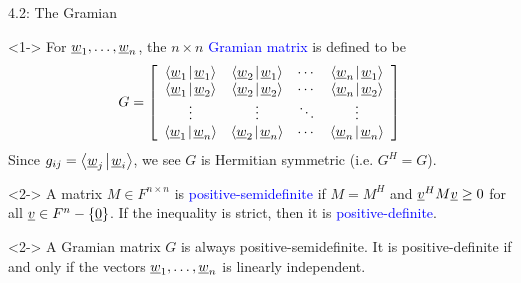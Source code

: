 \documentclass[10pt,english,aspectratio=169]{beamer}
\begin{document}
\begin{frame}{4.2: The Gramian}

\vspace{-1.5mm}

\begin{definition}<1->
For $\underline{w}_1,\ldots,\underline{w}_n$, the $n \times n$ \textcolor{blue}{Gramian matrix} is defined to be \vspace{-2mm}
\begin{equation*}
G = \left[ \begin{array}{cccc}
\inner{ \vecnot{w}_1 }{ \vecnot{w}_1 }
& \inner{ \vecnot{w}_2 }{ \vecnot{w}_1 } & \cdots
& \inner{ \vecnot{w}_n }{ \vecnot{w}_1 } \\
\inner{ \vecnot{w}_1 }{ \vecnot{w}_2 }
& \inner{ \vecnot{w}_2 }{ \vecnot{w}_2 } & \cdots
& \inner{ \vecnot{w}_n }{ \vecnot{w}_2 } \\
\vdots & \vdots & \ddots & \vdots \\
\inner{ \vecnot{w}_1 }{ \vecnot{w}_n }
& \inner{ \vecnot{w}_2 }{ \vecnot{w}_n } & \cdots
& \inner{ \vecnot{w}_n }{ \vecnot{w}_n }
\end{array} \right] \vspace{-1mm}
\end{equation*}
Since $g_{ij} = \smash{{\left\langle  \underline{w}_j  \mskip2mu \middle| \mskip2mu  \underline{w}_i  \right\rangle}}$, we see $G$ is Hermitian symmetric (i.e. $G^H = G$).
\end{definition}

\vspace{-1mm}

\begin{definition}<2->
A matrix $M\in F^{n \times n}$ is \textcolor{blue}{positive-semidefinite} if $M=M^H$ and $\underline{v}^H M \underline{v} \geq 0$ for all $\underline{v} \in F^n - \left\{ \underline{0} \right\}$.
If the inequality is strict, then it is \textcolor{blue}{positive-definite}.
\end{definition}

\vspace{-1mm}

\begin{theorem}<2->
A Gramian matrix $G$ is always positive-semidefinite.
It is positive-definite if and only if the vectors $\underline{w}_1, \ldots, \underline{w}_n$ is linearly independent.
\end{theorem}
\vspace{-1mm}


\end{frame}
\end{document}
